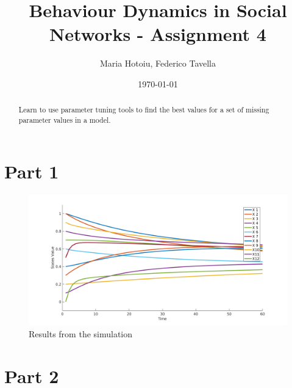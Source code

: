 \documentclass[a4paper]{article}
\title{Behaviour Dynamics in Social Networks - Assignment 4}
\author{Maria Hotoiu, Federico Tavella}
\date{\today}
\begin{document}
\maketitle

\begin{abstract}
Learn to use parameter tuning tools to find the best values for a set of missing parameter values in a model.
\end{abstract}

\section{Part 1}

\begin{figure}[!htpb]
\center
\includegraphics[width=1.2\textwidth]{res/img/part1}
\caption{Results from the simulation}
\label{fig:part1}
\end{figure}

\section{Part 2}
\end{document}
